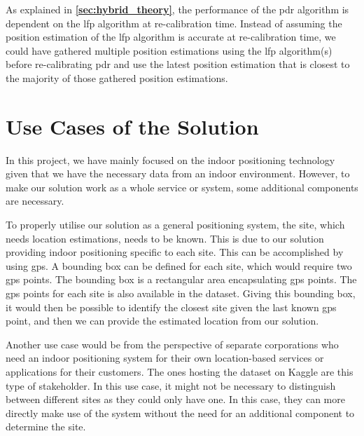 As explained in \textbf{\autoref{sec:hybrid_theory}}, the performance of the \gls{pdr} algorithm is dependent on the \gls{lfp} algorithm at re-calibration time. Instead of assuming the position estimation of the \gls{lfp} algorithm is accurate at re-calibration time, we could have gathered multiple position estimations using the \gls{lfp} algorithm(s) before re-calibrating \gls{pdr} and use the latest position estimation that is closest to the majority of those gathered position estimations.

\section{Use Cases of the Solution}
In this project, we have mainly focused on the indoor positioning technology given that we have the necessary data from an indoor environment. However, to make our solution work as a whole service or system, some additional components are necessary.

To properly utilise our solution as a general positioning system, the site, which needs location estimations, needs to be known. This is due to our solution providing indoor positioning specific to each site. This can be accomplished by using \gls{gps}. A bounding box can be defined for each site, which would require two \gls{gps} points. The bounding box is a rectangular area encapsulating \gls{gps} points. The \gls{gps} points for each site is also available in the dataset. Giving this bounding box, it would then be possible to identify the closest site given the last known \gls{gps} point, and then we can provide the estimated location from our solution.

Another use case would be from the perspective of separate corporations who need an indoor positioning system for their own location-based services or applications for their customers. The ones hosting the dataset on Kaggle are this type of stakeholder. In this use case, it might not be necessary to distinguish between different sites as they could only have one. In this case, they can more directly make use of the system without the need for an additional component to determine the site.